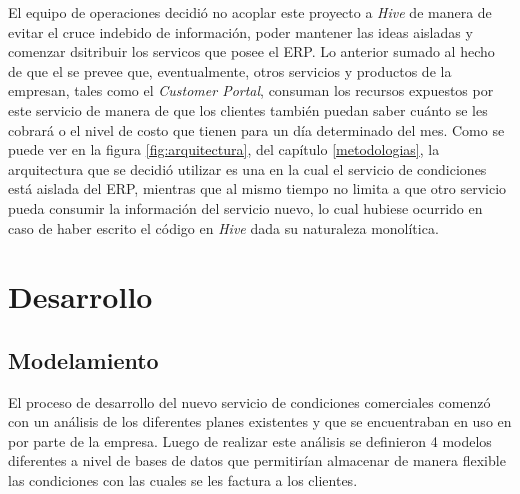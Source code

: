   El equipo de operaciones decidió no acoplar este proyecto a \textit{Hive} de manera de evitar el cruce indebido de información, poder mantener las ideas aisladas y comenzar dsitribuir los servicos que posee el ERP. Lo anterior sumado al hecho de que el se prevee que, eventualmente, otros servicios y productos de la empresan, tales como el \textit{Customer Portal}, consuman los recursos expuestos por este servicio de manera de que los clientes también puedan saber cuánto se les cobrará o el nivel de costo que tienen para un día determinado del mes. Como se puede ver en la figura \ref{fig:arquitectura}, del capítulo \ref{metodologias}, la arquitectura que se decidió utilizar es una en la cual el servicio de condiciones está aislada del ERP, mientras que al mismo tiempo no limita a que otro servicio pueda consumir la información del servicio nuevo, lo cual hubiese ocurrido en caso de haber escrito el código en \textit{Hive} dada su naturaleza monolítica.

\section{Desarrollo}

  \subsection{Modelamiento}
    \label{modelamiento}

    El proceso de desarrollo del nuevo servicio de condiciones comerciales comenzó con un análisis de los diferentes planes existentes y que se encuentraban en uso en por parte de la empresa. Luego de realizar este análisis se definieron 4 modelos diferentes a nivel de bases de datos que permitirían almacenar de manera flexible las condiciones con las cuales se les factura a los clientes. 
    
